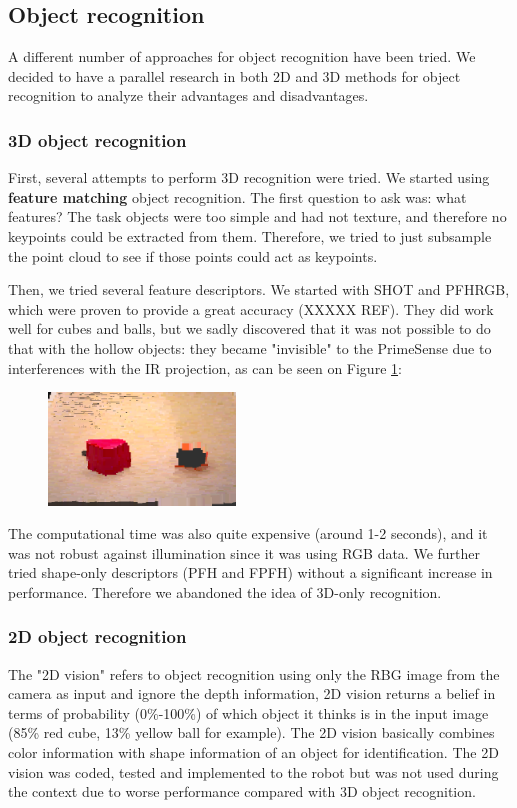 \subsection{Object recognition}
A different number of approaches for object recognition have been tried. We decided to have a parallel research in both 2D and 3D methods for object recognition to analyze their advantages and disadvantages. 

\subsubsection{3D object recognition}
First, several attempts to perform 3D recognition were tried. We started using \textbf{feature matching} object recognition. The first question to ask was: what features? The task objects were too simple and had not texture, and therefore no keypoints could be extracted from them. Therefore, we tried to just subsample the point cloud to see if those points could act as keypoints.

Then, we tried several feature descriptors. We started with SHOT and PFHRGB, which were proven to provide a great accuracy (XXXXX REF). They did work well for cubes and balls, but we sadly discovered that it was not possible to do that with the hollow objects: they became "invisible" to the PrimeSense due to interferences with the IR projection, as can be seen on Figure \ref{fig:invisible}: 

\begin{figure}[h]
\centering
                \includegraphics[height=3cm]{figures/concave.png}
		        \label{fig:invisible}
\end{figure}

The computational time was also quite expensive (around 1-2 seconds), and it was not robust against illumination since it was using RGB data. We further tried shape-only descriptors (PFH and FPFH) without a significant increase in performance. Therefore we abandoned the idea of 3D-only recognition.

\subsubsection{2D object recognition}
The "2D vision" refers to object recognition using only the RBG image from the camera as input and ignore the depth information, 2D vision returns a belief in terms of probability (0\%-100\%) of which object it thinks is in the input image (85\% red cube, 13\% yellow ball for example). The 2D vision basically combines color information with shape information of an object for identification. The 2D vision was coded, tested and implemented to the robot but was not used during the context due to worse performance compared with 3D object recognition.

